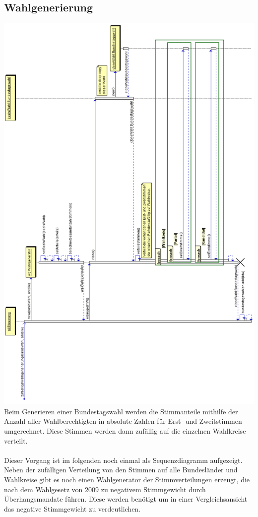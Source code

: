 \documentclass[12pt,a4paper,titlepage]{article}
\begin{document}
\subsection{Wahlgenerierung}
\includegraphics[scale=0.45]{zufaelligeWahlgenerierung_Sequenzdiagramm.png}
Beim Generieren einer Bundestagswahl werden die Stimmanteile mithilfe der Anzahl aller Wahlberechtigten in absolute Zahlen für Erst- und Zweitstimmen umgerechnet. Diese Stimmen werden dann zufällig auf die einzelnen Wahlkreise verteilt.\\\\
Dieser Vorgang ist im folgenden noch einmal als Sequenzdiagramm aufgezeigt.
Neben der zufälligen Verteilung von den Stimmen auf alle Bundesländer und Wahlkreise gibt es noch einen Wahlgenerator der Stimmverteilungen erzeugt, die nach dem Wahlgesetz von 2009 zu negativem Stimmgewicht durch Überhangsmandate führen. Diese werden benötigt um in einer Vergleichsansicht das negative Stimmgewicht zu verdeutlichen.
\end{document}
